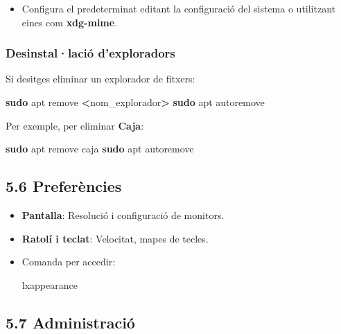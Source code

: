\documentclass[
  a4paper,
]{article}
\newenvironment{Shaded}{\begin{snugshade}}{\end{snugshade}}
\newcommand{\ExtensionTok}[1]{#1}
\newcommand{\FunctionTok}[1]{\textcolor[rgb]{0.13,0.29,0.53}{\textbf{#1}}}
\newcommand{\NormalTok}[1]{#1}
\newcommand{\OperatorTok}[1]{\textcolor[rgb]{0.81,0.36,0.00}{\textbf{#1}}}
\providecommand{\tightlist}{%
  \setlength{\itemsep}{0pt}\setlength{\parskip}{0pt}}
\begin{document}
\begin{itemize}
\tightlist
\item
  Configura el predeterminat editant la configuració del sistema o
  utilitzant eines com \textbf{xdg-mime}.
\end{itemize}

\subsubsection{Desinstal·lació
d'exploradors}\label{desinstallaciuxf3-dexploradors}

Si desitges eliminar un explorador de fitxers:

\begin{Shaded}
\begin{Highlighting}[]
\FunctionTok{sudo}\NormalTok{ apt remove }\OperatorTok{\textless{}}\NormalTok{nom\_explorador}\OperatorTok{\textgreater{}}
\FunctionTok{sudo}\NormalTok{ apt autoremove}
\end{Highlighting}
\end{Shaded}

Per exemple, per eliminar \textbf{Caja}:

\begin{Shaded}
\begin{Highlighting}[]
\FunctionTok{sudo}\NormalTok{ apt remove caja}
\FunctionTok{sudo}\NormalTok{ apt autoremove}
\end{Highlighting}
\end{Shaded}

\subsection{5.6 Preferències}\label{preferuxe8ncies}

\begin{itemize}
\item
  \textbf{Pantalla}: Resolució i configuració de monitors.
\item
  \textbf{Ratolí i teclat}: Velocitat, mapes de tecles.
\item
  Comanda per accedir:

\begin{Shaded}
\begin{Highlighting}[]
\ExtensionTok{lxappearance}
\end{Highlighting}
\end{Shaded}
\end{itemize}

\subsection{5.7 Administració}\label{administraciuxf3}
\end{document}
